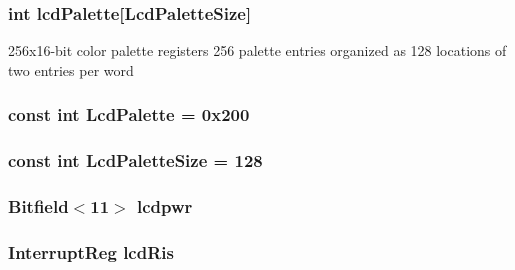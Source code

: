 \label{classPl111_a6e4fb7a990dd12fac2111fcddc777293}
\hypertarget{classPl111_ae214882030fa17459f741e5b0afc2b12}{
\subsubsection[{lcdPalette}]{\setlength{\rightskip}{0pt plus 5cm}int {\bf lcdPalette}\mbox{[}{\bf LcdPaletteSize}\mbox{]}}}
\label{classPl111_ae214882030fa17459f741e5b0afc2b12}
256x16-\/bit color palette registers 256 palette entries organized as 128 locations of two entries per word \hypertarget{classPl111_a097bcd7c2d25dfaeccce1e343cb58495}{
\subsubsection[{LcdPalette}]{\setlength{\rightskip}{0pt plus 5cm}const int {\bf LcdPalette} = 0x200}}
\label{classPl111_a097bcd7c2d25dfaeccce1e343cb58495}
\hypertarget{classPl111_a12008db88a2d42b82d27aa2de179af45}{
\subsubsection[{LcdPaletteSize}]{\setlength{\rightskip}{0pt plus 5cm}const int {\bf LcdPaletteSize} = 128}}
\label{classPl111_a12008db88a2d42b82d27aa2de179af45}
\hypertarget{classPl111_a3e0d21d15a72646c76bb73983fb1ba0c}{
\subsubsection[{lcdpwr}]{\setlength{\rightskip}{0pt plus 5cm}Bitfield$<$11$>$ {\bf lcdpwr}}}
\label{classPl111_a3e0d21d15a72646c76bb73983fb1ba0c}
\hypertarget{classPl111_a977905b70318298f359957fea2723d97}{
\subsubsection[{lcdRis}]{\setlength{\rightskip}{0pt plus 5cm}InterruptReg {\bf lcdRis}}}
